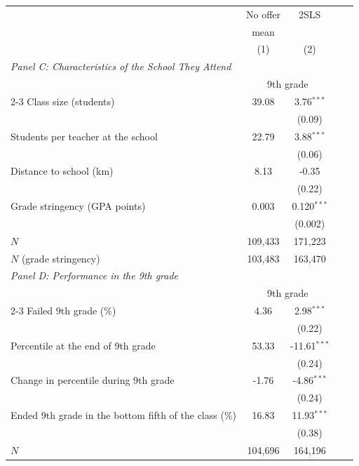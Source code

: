\begin{tabular}{lcccc}
\toprule
 & No offer & 2SLS &  & \\
 & mean &  &  & \\
 & (1) & (2) &  & \\
\midrule
\multicolumn{5}{l}{\textit{Panel C: Characteristics of the School They Attend}}\\
 & \multicolumn{2}{c}{9th grade} &  & \\
\cmidrule(lr){2-3}
Class size (students) & 39.08 & 3.76$^{***}$ &  & \\
 &  & (0.09) &  & \\
Students per teacher at the school & 22.79 & 3.88$^{***}$ &  & \\
 &  & (0.06) &  & \\
Distance to school (km) & 8.13 & -0.35 &  & \\
 &  & (0.22) &  & \\
Grade stringency (GPA points) & 0.003 & 0.120$^{***}$ &  & \\
 &  & (0.002) &  & \\
\midrule
$N$ & 109,433 & 171,223 &  & \\
$N$ (grade stringency) & 103,483 & 163,470 &  & \\
\midrule
\multicolumn{5}{l}{\textit{Panel D: Performance in the 9th grade}}\\
 & \multicolumn{2}{c}{9th grade} &  & \\
\cmidrule(lr){2-3}
Failed 9th grade (\%) & 4.36 & 2.98$^{***}$ &  & \\
 &  & (0.22) &  & \\
Percentile at the end of 9th grade & 53.33 & -11.61$^{***}$ &  & \\
 &  & (0.24) &  & \\
Change in percentile during 9th grade & -1.76 & -4.86$^{***}$ &  & \\
 &  & (0.24) &  & \\
Ended 9th grade in the bottom fifth of the class (\%) & 16.83 & 11.93$^{***}$ &  & \\
 &  & (0.38) &  & \\
\midrule
$N$ & 104,696 & 164,196 &  & \\
\bottomrule
\end{tabular}
